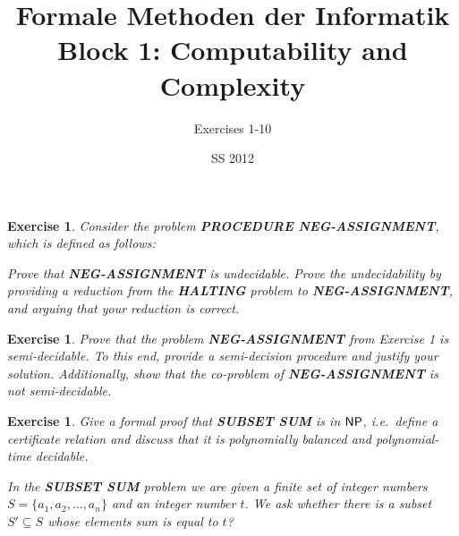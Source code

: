 \documentclass [11pt]{article}
\title{Formale Methoden der Informatik \\
Block 1: Computability and Complexity }
\author{Exercises 1-10}
\date{SS 2012}
\newtheorem{exercise}[theorem]{Exercise}
\newcommand{\ccfont}[1]{\protect\mathsf{#1}}
\newcommand{\NP}{\ccfont{NP}}
\begin{document}
\maketitle


\begin{exercise}
  Consider the problem \textbf{PROCEDURE NEG-ASSIGNMENT}, which is defined
  as follows:

  \begin{center}
  \end{center}
  Prove that \textbf{NEG-ASSIGNMENT} is undecidable. Prove the undecidability
  by providing a reduction from the \textbf{HALTING} problem to
  \textbf{NEG-ASSIGNMENT}, and arguing that your reduction is correct.
\end{exercise}




\begin{exercise}
  Prove that the problem \textbf{NEG-ASSIGNMENT} from Exercise 1 is semi-decidable. 
To this end, provide a semi-decision procedure and justify your solution. Additionally,  show that the co-problem of \textbf{NEG-ASSIGNMENT} is not semi-decidable.
\end{exercise}




\begin{exercise}
  Give a formal proof that \textbf{SUBSET SUM} is in $\NP$, i.e.\, define a
  certificate relation and discuss that it is polynomially balanced and
  polynomial-time decidable.
  
   \smallskip
    
  \noindent In the \textbf{SUBSET SUM} problem we are given a finite set of integer numbers $S=\{a_1, a_2, \ldots, a_n\}$ and an integer number $t$. We ask whether there is a subset $S'\subseteq S$ whose elements sum is equal to $t$?
  
\end{exercise}
\end{document}
